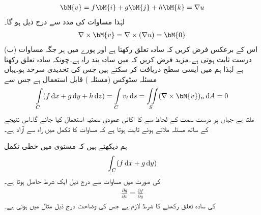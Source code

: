 \begin{align*}
\bM{v}=f\bM{i}+g\bM{j}+h\bM{k}=\nabla  u
\end{align*}
لہٰذا  مساوات  کی مدد سے درج ذیل ہو گا۔
\begin{align*}
\nabla \times \bM{v}=\nabla \times (\nabla u)=\bM{0}
\end{align*}
(ب) اس کے برعکس فرض کریں کہ  سادہ تعلق رکھتا ہے اور  پورے  میں ہر جگہ مساوات  درست ثابت ہوتی ہے۔مزید فرض کریں کہ  میں  سادہ بند راہ ہے۔چونکہ  سادہ تعلق رکھتا ہے لہٰذا ہم  میں ایسی سطح  دریافت کر سکتے ہیں جس کی تحدیدی سرحد  ہو۔یہاں مسئلہ سٹوکس (مسئلہ ) قابل استعمال  ہے جس سے
\begin{align*}
\int\limits_C(f\dif x+g\dif y+h\dif z)=\int\limits_C v_t \dif s=\iint\limits_S (\nabla \times \bM{v})_n \dif A=0
\end{align*}
ملتا ہے جہاں  پر درست سمت کے لحاظ سے  کا اکائی عمودی سمتیہ  استعمال کیا جائے گا۔اس نتیجے کے ساتھ مسئلہ  ملاتے ہوئے ثابت ہوتا ہے کہ  مساوات  کا تکمل  میں راہ سے آزاد ہے۔

ہم دیکھتے ہیں کہ  مستوی میں خطی تکمل
\begin{align*}
\int_C (f\dif x+g\dif y)
\end{align*}
کی صورت میں مساوات  سے درج ذیل ایک شرط حاصل ہوتا ہے۔
\begin{align}\label{مساوات_خطی_تکمل_دو_متغیرات_شرط}
\frac{\partial g}{\partial x}=\frac{\partial f}{\partial y}
\end{align}
 کی سادہ تعلق رکھنے کا شرط  لازم ہے جس کی وضاحت درج ذیل مثال میں ہوتی ہے۔


